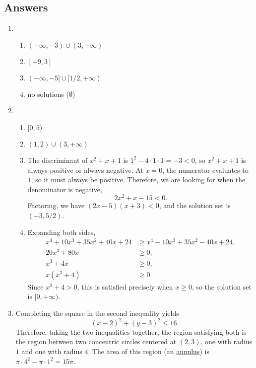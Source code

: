 \newpage
\subsection{Answers}

\begin{enumerate}
\item \begin{enumerate}
\item $(-\infty, -3)\cup (3, +\infty)$
\item $[-9,3]$
\item $(-\infty, -5]\cup [1/2, +\infty)$
\item no solutions ($\emptyset$)
\end{enumerate}
\item \begin{enumerate}
\item $[0, 5)$
\item $(1,2)\cup (3, +\infty)$
\item The discriminant of $x^2 + x + 1$ is $1^2 - 4\cdot 1\cdot 1 = -3 < 0$, so $x^2 + x + 1$ is always positive or always negative. At $x = 0$, the numerator evaluates to $1$, so it must always be positive. Therefore, we are looking for when the denominator is negative,
\begin{equation*}
2x^2 + x - 15 < 0.
\end{equation*}
Factoring, we have $(2x - 5)(x + 3) < 0$, and the solution set is $\boxed{(-3, 5/2)}$.
\item Expanding both sides,
\begin{align*} 
x^4 + 10x^3 + 35x^2 + 40x + 24 &\geq x^4 - 10x^3 + 35x^2 - 40x + 24, \\
20x^3 + 80x &\geq 0, \\
x^3 + 4x &\geq 0, \\
x(x^2 + 4) &\geq 0.
\end{align*}
Since $x^2 + 4 > 0$, this is satisfied precisely when $x\geq 0$, so the solution set is $\boxed{[0, +\infty)}$.
\end{enumerate}
\item Completing the square in the second inequality yields
\begin{equation*}
(x - 2)^2 + (y - 3)^2\leq 16.
\end{equation*}
Therefore, taking the two inequalities together, the region satisfying both is the region between two concentric circles centered at $(2,3)$, one with radius $1$ and one with radius $4$. The area of this region (an \href{https://en.wikipedia.org/wiki/Annulus_(mathematics)}{annulus}) is $\pi\cdot 4^2 - \pi\cdot 1^2 = \boxed{15\pi}$.

\end{enumerate}
